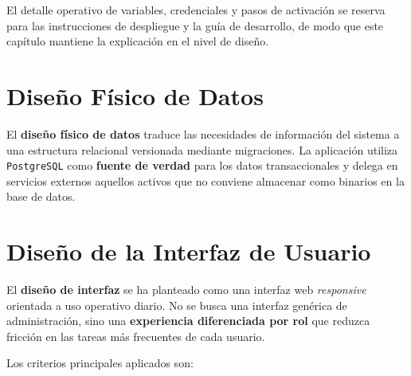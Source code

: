 El detalle operativo de variables, credenciales y pasos de activación se reserva para las instrucciones de despliegue y la guía de desarrollo, de modo que este capítulo mantiene la explicación en el nivel de diseño.

\section{Diseño Físico de Datos}
\label{sec:storageDesign}

El \textbf{diseño físico de datos} traduce las necesidades de información del sistema a una estructura relacional versionada mediante migraciones. La aplicación utiliza \texttt{PostgreSQL} como \textbf{fuente de verdad} para los datos transaccionales y delega en servicios externos aquellos activos que no conviene almacenar como binarios en la base de datos.



\section{Diseño de la Interfaz de Usuario}

El \textbf{diseño de interfaz} se ha planteado como una interfaz web \textit{responsive} orientada a uso operativo diario. No se busca una interfaz genérica de administración, sino una \textbf{experiencia diferenciada por rol} que reduzca fricción en las tareas más frecuentes de cada usuario.

Los criterios principales aplicados son:

